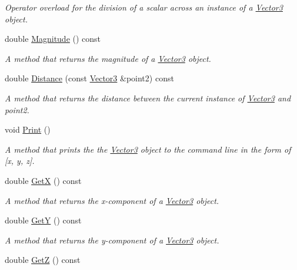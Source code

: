 \begin{DoxyCompactItemize}
\begin{DoxyCompactList}\small\item\em Operator overload for the division of a scalar across an instance of a \hyperlink{classVector3}{Vector3} object. \end{DoxyCompactList}\item 
double \hyperlink{classVector3_a96e6e436600d1420250ef2868854988d}{Magnitude} () const
\begin{DoxyCompactList}\small\item\em A method that returns the magnitude of a \hyperlink{classVector3}{Vector3} object. \end{DoxyCompactList}\item 
double \hyperlink{classVector3_a0d6027056f981cfe6a12d2ffaad0cf51}{Distance} (const \hyperlink{classVector3}{Vector3} \&point2) const
\begin{DoxyCompactList}\small\item\em A method that returns the distance between the current instance of \hyperlink{classVector3}{Vector3} and point2. \end{DoxyCompactList}\item 
\mbox{\label{classVector3_ab4e0ba9b985cd5cf0e8960d1e449581e}} 
void \hyperlink{classVector3_ab4e0ba9b985cd5cf0e8960d1e449581e}{Print} ()
\begin{DoxyCompactList}\small\item\em A method that prints the the \hyperlink{classVector3}{Vector3} object to the command line in the form of \mbox{[}x, y, z\mbox{]}. \end{DoxyCompactList}\item 
double \hyperlink{classVector3_ad4607794c0c8cc99b3be516b69d95030}{GetX} () const
\begin{DoxyCompactList}\small\item\em A method that returns the x-\/component of a \hyperlink{classVector3}{Vector3} object. \end{DoxyCompactList}\item 
double \hyperlink{classVector3_a31995bcdcdd4363a5e467f4ade0abf9b}{GetY} () const
\begin{DoxyCompactList}\small\item\em A method that returns the y-\/component of a \hyperlink{classVector3}{Vector3} object. \end{DoxyCompactList}\item 
double \hyperlink{classVector3_a4212c6c9c1c49feedf6de46522286e45}{GetZ} () const

\end{DoxyCompactItemize}
